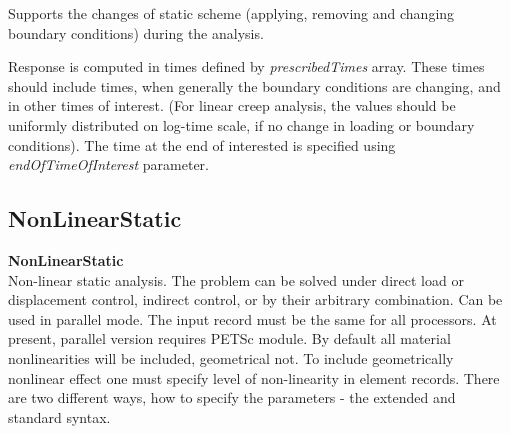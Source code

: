 \documentclass[draft]{article}
\newcommand{\param}[1]{{\em #1}}
\newcommand{\entKeywordInst}[1]{\mbox{{\bf{{#1}}}}}
\newcommand{\Pmode}[1]{{\sffamily #1}}
\begin{document}
Supports the changes of static scheme (applying, removing and changing  boundary conditions) 
during the analysis.

Response is computed in times defined by \param{pre\-scri\-bed\-Ti\-mes}
array. These times should include times, when generally the  boundary
conditions are changing, and in other times of interest. (For linear creep
analysis, the values should be uniformly distributed on log-time scale, if no change in
loading or boundary conditions). The time at the end of interested is
specified using \param{endOfTimeOfInterest} parameter.

\subsection{NonLinearStatic}
\label{NonLinearStatic}
\entKeywordInst{NonLinearStatic} \\
Non-linear static analysis. The problem can be solved under 
direct load or displacement control, indirect control, or by
their arbitrary combination.
\Pmode{Can be used in parallel mode. The input record must be the same
for all processors. At present, parallel version requires PETSc module.}
By default all
material nonlinearities will be included, geometrical not. 
To include geometrically nonlinear effect one must specify
level of non-linearity in element records.
There are two different ways, how to specify the parameters - the
extended and standard syntax. 
\end{document}
